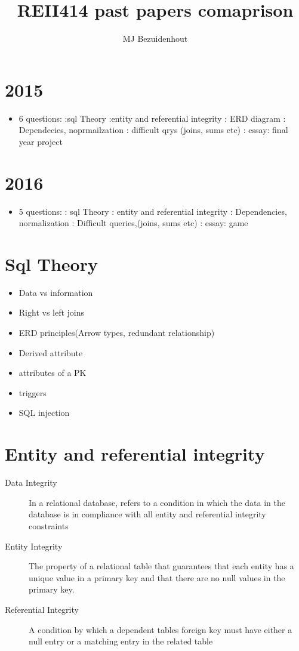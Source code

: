 \documentclass{article}
\title{REII414 past papers comaprison}
\author{MJ Bezuidenhout}
\begin{document}
\maketitle
\section{2015}
\begin{itemize}
	\item 6 questions:
		:sql Theory
		:entity and referential integrity
		: ERD diagram
		: Dependecies, noprmailzation
		: difficult qrys (joins, sums etc)
		: essay: final year project
\end{itemize}
\section{2016}
\begin{itemize}
	\item 5 questions:
		: sql Theory 
		: entity and referential integrity
		: Dependencies, normalization
		: Difficult queries,(joins, sums etc)
		: essay: game
\end{itemize}
\section{Sql Theory}
\begin{itemize}
	\item Data vs information
	\item Right vs left joins
	\item ERD principles(Arrow types, redundant relationship)
	\item Derived attribute
	\item attributes of a PK
	\item triggers
	\item SQL injection
\end{itemize}
\section{Entity and referential integrity}
\begin{description}
	\item[Data Integrity] In a relational database, refers to a condition
in which the data in the database is in compliance with all entity and referential integrity constraints 
	\item[Entity Integrity]  The property of a relational table that guarantees that each entity has a unique value in a
primary key and that there are no null values in
the primary key.
	\item[Referential Integrity] A condition by which a dependent tables foreign key must have either a null entry or a matching entry in the related table
\end{description}
\end{document}
